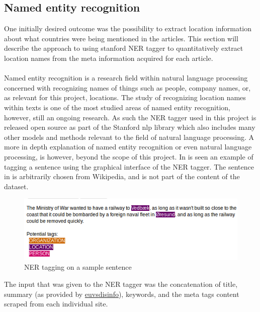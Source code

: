 \documentclass{article}
\begin{document}
\subsection{Named entity recognition}
One initially desired outcome was the possibility to extract location information about what countries were being mentioned in the articles. This section will describe the approach to using stanford NER tagger to quantitatively extract location names from the meta information acquired for each article.
\\\\
Named entity recognition is a research field within natural language processing concerned with recognizing names of things such as people, company names, or, as relevant for this project, locations. The study of recognizing location names within texts is one of the most studied areas of named entity recognition, however, still an ongoing research. As such the NER tagger used in this project is released open source as part of the Stanford nlp library\cite{manning-EtAl:2014:P14-5} which also includes many other models and methods relevant to the field of natural language processing. 
A more in depth explanation of named entity recognition or even natural language processing, is however, beyond the scope of this project. 
In  is seen an example of tagging a sentence using the graphical interface of the NER tagger. The sentence in  is arbitrarily chosen from Wikipedia, and is not part of the content of the dataset.

\begin{figure}[H]
\caption{NER tagging on a sample sentence}
\label{fig:ner_tagging}
\includegraphics[width=\textwidth]{images/sample_tagging.png}
\end{figure}

The input that was given to the NER tagger was the concatenation of title, summary (as provided by \url{euvsdisinfo}), keywords, and the meta tags content scraped from each individual site.
\end{document}
